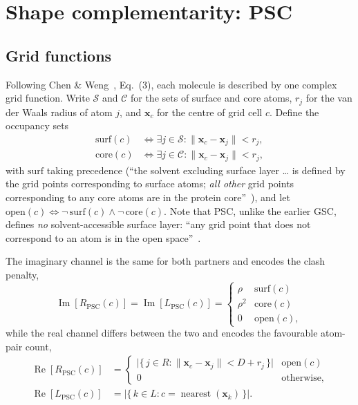 \documentclass[11pt,a4paper]{article}
\newcommand{\Rgrid}{R}
\newcommand{\Lgrid}{L}
\begin{document}
\section{Shape complementarity: PSC}

\subsection{Grid functions}

Following Chen \& Weng~\cite{ChenWeng2003psc}, Eq.~(3), each molecule is
described by one complex grid function. Write $\mathcal{S}$ and $\mathcal{C}$
for the sets of surface and core atoms, $r_j$ for the van der Waals radius of
atom $j$, and $\mathbf{x}_c$ for the centre of grid cell $c$. Define the
occupancy sets
\begin{align}
  \mathrm{surf}(c) &\iff \exists j\in\mathcal{S}: \lVert \mathbf{x}_c-\mathbf{x}_j\rVert < r_j, \\
  \mathrm{core}(c) &\iff \exists j\in\mathcal{C}: \lVert \mathbf{x}_c-\mathbf{x}_j\rVert < r_j,
\end{align}
with $\mathrm{surf}$ taking precedence (``the solvent excluding surface layer
\ldots{} is defined by the grid points corresponding to surface atoms; \emph{all
other} grid points corresponding to any core atoms are in the protein
core''~\cite{ChenWeng2003psc,Chen2003zdock}), and let
$\mathrm{open}(c)\iff \neg\,\mathrm{surf}(c)\wedge\neg\,\mathrm{core}(c)$.
Note that PSC, unlike the earlier GSC, defines \emph{no} solvent-accessible
surface layer: ``any grid point that does not correspond to an atom is in the
open space''~\cite{ChenWeng2003psc}.

The imaginary channel is the same for both partners and encodes the clash
penalty,
\begin{equation}
  \operatorname{Im}[\Rgrid_{\mathrm{PSC}}(c)]
  = \operatorname{Im}[\Lgrid_{\mathrm{PSC}}(c)]
  = \begin{cases}
      \rho   & \mathrm{surf}(c)\\
      \rho^2 & \mathrm{core}(c)\\
      0      & \mathrm{open}(c),
    \end{cases}
  \label{eq:psc-im}
\end{equation}
while the real channel differs between the two and encodes the favourable
atom-pair count,
\begin{align}
  \operatorname{Re}[\Rgrid_{\mathrm{PSC}}(c)] &=
    \begin{cases}
      \bigl|\{\, j \in R : \lVert \mathbf{x}_c-\mathbf{x}_j\rVert < D + r_j \,\}\bigr|
        & \mathrm{open}(c)\\
      0 & \text{otherwise,}
    \end{cases}
  \label{eq:psc-reR}\\[2pt]
  \operatorname{Re}[\Lgrid_{\mathrm{PSC}}(c)] &=
    \bigl|\{\, k \in L : c = \operatorname{nearest}(\mathbf{x}_k) \,\}\bigr|.
  \label{eq:psc-reL}
\end{align}
\end{document}
